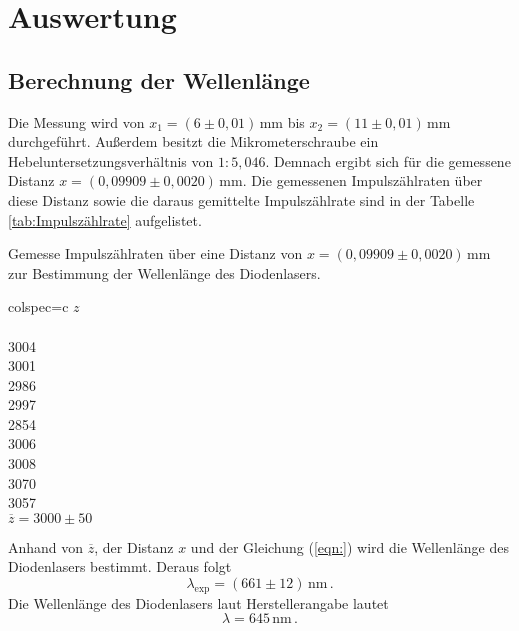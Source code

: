 \section{Auswertung}
\label{sec:Auswertung}
\subsection{Berechnung der Wellenlänge}
Die Messung wird von $x_1 = (6 \pm 0,01)\,\unit{\milli\metre}$ bis $x_2 = (11 \pm 0,01)\,\unit{\milli\metre}$ durchgeführt. Außerdem besitzt die Mikrometerschraube ein Hebeluntersetzungsverhältnis von 
$1 : 5,046$.  Demnach ergibt sich für die gemessene Distanz $x = (0,09909\pm 0,0020) \,\unit{\milli\metre}$. Die gemessenen Impulszählraten über diese Distanz sowie die daraus gemittelte Impulszählrate
sind in der Tabelle \ref{tab:Impulszählrate} aufgelistet.
\begin{table}[H]
    \centering
    \caption{Gemesse Impulszählraten über eine Distanz von $x = (0,09909\pm 0,0020) \,\unit{\milli\metre}$ zur Bestimmung der Wellenlänge des Diodenlasers.}
    \label{tab:Impulszählrate}
    \begin{tblr}{colspec={c}}
        \toprule
        $z$\\
        \\
        3004\\
        3001\\
        2986\\
        2997\\
        2854\\
        3006\\
        3008\\
        3070\\
        3057\\
        \midrule
        $\overline{z} = 3000\pm50$\\
        \bottomrule
    \end{tblr}
\end{table}
Anhand von $\overline{z}$, der Distanz $x$ und der Gleichung (\ref{eqn:}) wird die Wellenlänge des Diodenlasers bestimmt. Deraus folgt
$$\lambda _{\text{exp}} = (661 \pm 12)\,\unit{\nano\metre}\,.$$
Die Wellenlänge des Diodenlasers laut Herstellerangabe lautet
$$\lambda = 645\,\unit{\nano\metre}\,.$$


